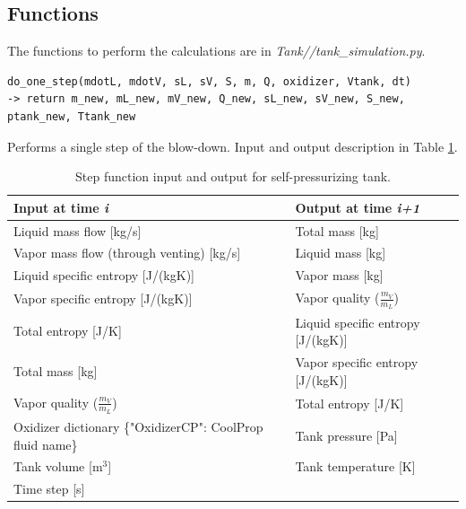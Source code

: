 \subsection{Functions}
The functions to perform the calculations are in \textit{Tank//tank\_simulation.py}.\\
\begin{verbatim}
do_one_step(mdotL, mdotV, sL, sV, S, m, Q, oxidizer, Vtank, dt) 
-> return m_new, mL_new, mV_new, Q_new, sL_new, sV_new, S_new, ptank_new, Ttank_new
\end{verbatim}
\hspace*{2em} Performs a single step of the blow-down. Input and output description in Table \ref{Tab: StepSelf-press}.
\begin{table}[h!]
\centering
\begin{tabular}{l|l}
\hline
\textbf{Input at time \textit{i}} & \textbf{Output at time \textit{i+1}} \\
\hline
Liquid mass flow [kg/s] & Total mass [kg] \\
Vapor mass flow (through venting) [kg/s] & Liquid mass [kg] \\
Liquid specific entropy [J/(kgK)] & Vapor mass [kg] \\
Vapor specific entropy [J/(kgK)] & Vapor quality ($\frac{m_V}{m_L}$) \\
Total entropy [J/K] & Liquid specific entropy [J/(kgK)] \\
Total mass [kg] & Vapor specific entropy [J/(kgK)] \\
Vapor quality ($\frac{m_V}{m_L}$) & Total entropy [J/K] \\
Oxidizer dictionary \{"OxidizerCP": CoolProp fluid name\} & Tank pressure [Pa] \\
Tank volume [m$^3$] & Tank temperature [K] \\
Time step [s] & \\
\hline
\end{tabular}
\caption{Step function input and output for self-pressurizing tank.}
\label{Tab: StepSelf-press}
\end{table}

